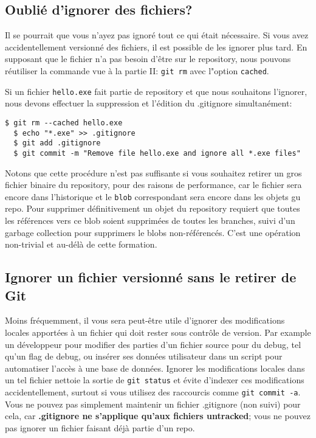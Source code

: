 \documentclass{../../common/tufte-latex/tufte-handout}
\begin{document}
\subsection{Oublié d'ignorer des fichiers?}
Il se pourrait que vous n'ayez pas ignoré tout ce qui était nécessaire.
Si vous avez accidentellement versionné des fichiers, il est possible de les ignorer plus tard.
En supposant que le fichier n'a pas besoin d'être sur le repository, nous pouvons réutiliser la commande vue à la partie II: \texttt{git rm} avec l"option \texttt{cached}.

Si un fichier \texttt{hello.exe} fait partie de repository et que nous souhaitons l'ignorer, nous devons effectuer la suppression et l'édition du .gitignore simultanément: 
\begin{lstlisting}[style=BashInputStyle]
  $ git rm --cached hello.exe
  $ echo "*.exe" >> .gitignore
  $ git add .gitignore
  $ git commit -m "Remove file hello.exe and ignore all *.exe files"
\end{lstlisting}

Notons que cette procédure n'est pas suffisante si vous souhaitez retirer un gros fichier binaire du repository, pour des raisons de performance, car le fichier sera encore dans l'historique et le \texttt{blob} correspondant sera encore dans les objets gu repo.
Pour supprimer définitivement un objet du repository requiert que toutes les références vers ce blob soient supprimées de toutes les branches, suivi d'un garbage collection pour supprimers le blobs non-référencés.
C'est une opération non-trivial et au-délà de cette formation.

\subsection{Ignorer un fichier versionné sans le retirer de Git}
Moins fréquemment, il vous sera peut-être utile d'ignorer des modifications locales apportées à un fichier qui doit rester sous contrôle de version.
Par example un développeur pour modifier des parties d'un fichier source pour du debug, tel qu'un flag de debug, ou insérer ses données utilisateur dans un script pour automatiser l'accès à une base de données.
Ignorer les modifications locales dans un tel fichier nettoie la sortie de \texttt{git status} et évite d'indexer ces modifications accidentellement, surtout si vous utilisez des raccourcis comme \texttt{git commit -a}. 
Vous ne pouvez pas simplement maintenir un fichier .gitignore (non suivi) pour cela, car \textbf{.gitignore ne s'applique qu'aux fichiers untracked}; vous ne pouvez pas ignorer un fichier faisant déjà partie d'un repo.
\end{document}
